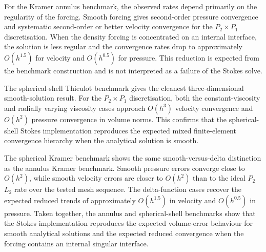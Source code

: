 For the Kramer annulus benchmark, the observed rates depend primarily on the
regularity of the forcing. Smooth forcing gives second-order pressure
convergence and systematic second-order or better velocity convergence for the
\(P_2\times P_1\) discretisation. When the density forcing is concentrated on an
internal interface, the solution is less regular and the convergence rates
drop to approximately \(O(h^{1.5})\) for velocity and \(O(h^{0.5})\) for
pressure. This reduction is expected from the benchmark construction and is
not interpreted as a failure of the Stokes solve.

The spherical-shell Thieulot benchmark gives the cleanest three-dimensional
smooth-solution result. For the \(P_2\times P_1\) discretisation, both the
constant-viscosity and radially varying viscosity cases approach
\(O(h^3)\) velocity convergence and \(O(h^2)\) pressure convergence in volume
norms. This confirms that the spherical-shell Stokes implementation reproduces
the expected mixed finite-element convergence hierarchy when the analytical
solution is smooth.

The spherical Kramer benchmark shows the same smooth-versus-delta distinction
as the annulus Kramer benchmark. Smooth pressure errors converge close to
\(O(h^2)\), while smooth velocity errors are closer to \(O(h^2)\) than to the
ideal \(P_2\) \(L_2\) rate over the tested mesh sequence. The delta-function
cases recover the expected reduced trends of approximately \(O(h^{1.5})\) in
velocity and \(O(h^{0.5})\) in pressure. Taken together, the annulus and
spherical-shell benchmarks show that the Stokes implementation reproduces the
expected volume-error behaviour for smooth analytical solutions and the
expected reduced convergence when the forcing contains an internal singular
interface.
